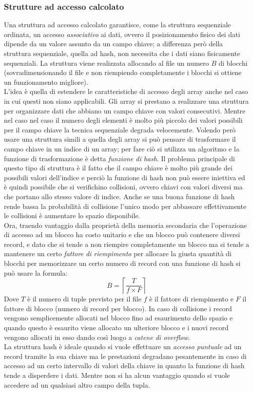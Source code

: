 \subsubsection{Strutture ad accesso calcolato}
Una struttura ad accesso calcolato garantisce, come la struttura sequenziale ordinata, un accesso \emph{associativo} ai dati, ovvero il posizionamento fisico dei dati dipende da un valore assunto da un campo chiave; a differenza però della struttura sequenziale, quella ad hash, non necessita che i dati siano fisicamente sequenziali. La struttura viene realizzata allocando al file un numero $B$ di blocchi (sovradimensionando il file e non riempiendo completamente i blocchi si ottiene un funzionamento migliore).\\
L'idea è quella di estendere le caratteristiche di accesso degli array anche nel caso in cui questi non siano applicabili. Gli array si prestano a realizzare una struttura per organizzare dati che abbiano un campo chiave con valori consecutivi. Mentre nel caso nel caso il numero degli elementi è molto più piccolo dei valori possibili per il campo chiave la tecnica sequenziale degrada velocemente. Volendo però usare una struttura simili a quella degli array si può pensare di trasformare il campo chiave in un indice di un array; per fare ciò si utilizza un algoritmo e la funzione di trasformazione è detta \emph{funzione di hash}. Il problema principale di questo tipo di struttura è il fatto che il campo chiave è molto più grande dei possibili valori dell'indice e perciò la funzione di hash non può essere iniettiva ed è quindi possibile che si verifichino collisioni, ovvero chiavi con valori diversi ma che portano allo stesso valore di indice. Anche se una buona funzione di hash rende bassa la probabilità di collisione l'unico modo per abbassare effettivamente le collisioni è aumentare lo spazio disponibile.\\
Ora, traendo vantaggio dalla proprietà della memoria secondaria che l'operazione di accesso ad un blocco ha costo unitario e che un blocco può contenere diversi record, e dato che si tende a non riempire completamente un blocco ma si tende a mantenere un certo \emph{fattore di riempimento} per allocare la giusta quantità di blocchi per memorizzare un certo numero di record con una funzione di hash si può usare la formula:
$$B=\left\lceil\frac{T}{f \times F}\right\rceil$$
Dove $T$ è il numero di tuple previsto per il file $f$ è il fattore di riempimento e $F$ il fattore di blocco (numero di record per blocco).
In caso di collisione i record vengono semplicemente allocati nel blocco fino ad esaurimento dello spazio e quando questo è esaurito viene allocato un ulteriore blocco e i nuovi record vengono allocati in esso dando così luogo a \emph{catene di overflow}.\\
La struttura hash è ideale quando si vuole effettuare un \emph{accesso puntuale} ad un record tramite la sua chiave ma le prestazioni degradano pesantemente in caso di accesso ad un certo intervallo di valori della chiave in quanto la funzione di hash tende a disperdere i dati. Mentre non si ha alcun vantaggio quando si vuole accedere ad un qualsiasi altro campo della tupla.

